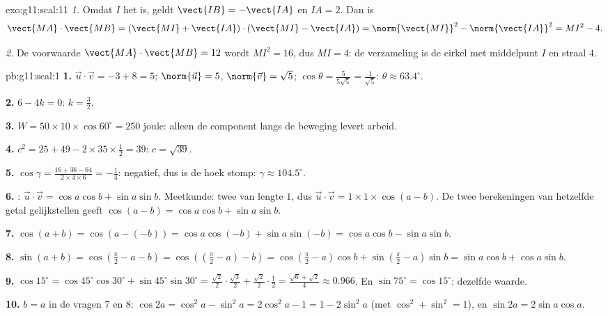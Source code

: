 \begin{solution}{exo:g11:scal:11}
\emph{1.} Omdat $I$ het  is, geldt $\vect{IB} = -\vect{IA}$ en
$IA = 2$. Dan is
\[
\vect{MA}\cdot\vect{MB}
= (\vect{MI} + \vect{IA})\cdot(\vect{MI} - \vect{IA})
= \norm{\vect{MI}}^2 - \norm{\vect{IA}}^2
= MI^2 - 4 .
\]

\emph{2.} De voorwaarde $\vect{MA}\cdot\vect{MB} = 12$ wordt $MI^2 = 16$,
dus $MI = 4$: de verzameling is de cirkel met middelpunt $I$ en straal $4$.
\end{solution}

\begin{solution}{pb:g11:scal:1}
\textbf{1.} $\vec u \cdot \vec v = -3 + 8 = 5$; $\norm{\vec u} = 5$,
$\norm{\vec v} = \sqrt5$; $\cos\theta = \frac{5}{5\sqrt5} =
\frac{1}{\sqrt5}$: $\theta \approx 63.4^\circ$.

\textbf{2.} $6 - 4k = 0$: $k = \frac32$.

\textbf{3.} $W = 50 \times 10 \times \cos 60^\circ = 250$ joule: alleen de
component langs de beweging levert arbeid.

\textbf{4.} $c^2 = 25 + 49 - 2 \times 35 \times \frac12 = 39$:
$c = \sqrt{39}$.

\textbf{5.} $\cos\gamma = \frac{16 + 36 - 64}{2 \times 4 \times 6} =
-\frac14$: negatief, dus is de hoek stomp: $\gamma \approx 104.5^\circ$.

\textbf{6.} : $\vec u \cdot \vec v = \cos a \cos b +
\sin a \sin b$. Meetkunde: twee  van lengte $1$, dus
$\vec u \cdot \vec v = 1 \times 1 \times \cos(a - b)$. De twee berekeningen
van hetzelfde getal gelijkstellen geeft
$\cos(a - b) = \cos a \cos b + \sin a \sin b$.

\textbf{7.} $\cos(a + b) = \cos(a - (-b)) = \cos a \cos(-b) +
\sin a \sin(-b) = \cos a \cos b - \sin a \sin b$.

\textbf{8.} $\sin(a + b) = \cos\left(\frac\pi2 - a - b\right)
= \cos\left(\left(\frac\pi2 - a\right) - b\right)
= \cos\left(\frac\pi2 - a\right)\cos b +
\sin\left(\frac\pi2 - a\right)\sin b = \sin a \cos b + \cos a \sin b$.

\textbf{9.} $\cos 15^\circ = \cos 45^\circ \cos 30^\circ +
\sin 45^\circ \sin 30^\circ = \frac{\sqrt2}{2} \cdot \frac{\sqrt3}{2} +
\frac{\sqrt2}{2} \cdot \frac12 = \frac{\sqrt6 + \sqrt2}{4} \approx 0.966$.
En $\sin 75^\circ = \cos 15^\circ$: dezelfde waarde.

\textbf{10.} $b = a$ in de vragen 7 en 8:
$\cos 2a = \cos^2 a - \sin^2 a = 2\cos^2 a - 1 = 1 - 2\sin^2 a$ (met
$\cos^2 + \sin^2 = 1$), en $\sin 2a = 2 \sin a \cos a$.


\end{solution}
